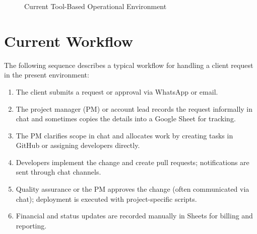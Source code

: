 \documentclass[12pt,a4paper]{report}
\begin{document}
\begin{figure}[H]
\centering
{}
\caption{Current Tool-Based Operational Environment}
\end{figure}

\section{Current Workflow}
The following sequence describes a typical workflow for handling a client request in the present environment:

\begin{enumerate}[leftmargin=2em]
    \item The client submits a request or approval via WhatsApp or email.
    \item The project manager (PM) or account lead records the request informally in chat and sometimes copies the details into a Google Sheet for tracking.
    \item The PM clarifies scope in chat and allocates work by creating tasks in GitHub or assigning developers directly.
    \item Developers implement the change and create pull requests; notifications are sent through chat channels.
    \item Quality assurance or the PM approves the change (often communicated via chat); deployment is executed with project-specific scripts.
    \item Financial and status updates are recorded manually in Sheets for billing and reporting.
\end{enumerate}
\end{document}
